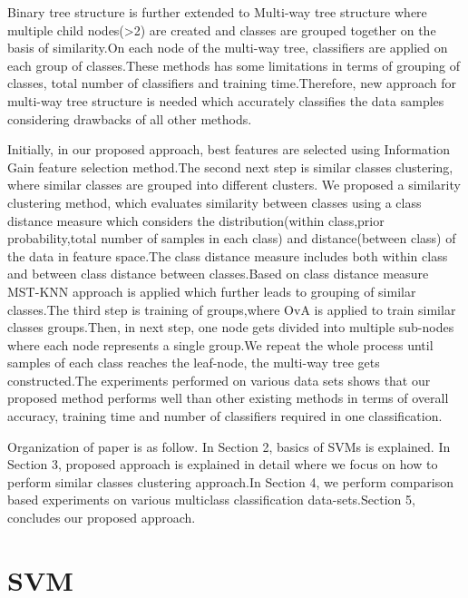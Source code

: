 \documentclass[a4paper, 10pt, conference]{ieeeconf}      %
\begin{document}
Binary tree structure is further extended to Multi-way tree structure where multiple child nodes(\textgreater2) are created and classes are grouped together on the basis of similarity.On each node of the multi-way tree, classifiers are applied on each group of classes.These methods has some limitations in terms of grouping of classes, total number of classifiers and training time.Therefore, new approach for multi-way tree structure is needed which accurately classifies the data samples considering drawbacks of all other methods. 
\vspace{0.5cm}
\par
Initially, in our proposed approach, best features are selected using Information Gain feature selection method.The second next step is similar classes clustering, where similar classes are grouped into different clusters.
We proposed a similarity clustering method, which evaluates similarity between classes using a class distance measure which considers the distribution(within class,prior probability,total number of samples in each class) and distance(between class) of the data in feature space.The class distance measure includes both within class and between class distance between classes.Based on class distance measure MST-KNN approach is applied which further leads to grouping of similar classes.The third step is training of groups,where OvA is applied to train similar classes groups.Then, in next step, one node gets divided into  multiple sub-nodes where each node represents a single group.We repeat the whole process until samples of each class reaches the leaf-node, the multi-way tree gets constructed.The experiments performed on various data sets shows that our proposed method performs well than other existing methods in terms of overall accuracy,  training time and number of classifiers required in one classification.

\par
Organization of paper is as follow. In Section 2, basics of SVMs is explained. In Section 3, proposed approach is explained in detail where we focus on how to perform similar classes clustering approach.In Section 4, we perform comparison based experiments on various multiclass classification data-sets.Section 5, concludes our proposed approach.


\section{SVM}
\end{document}
